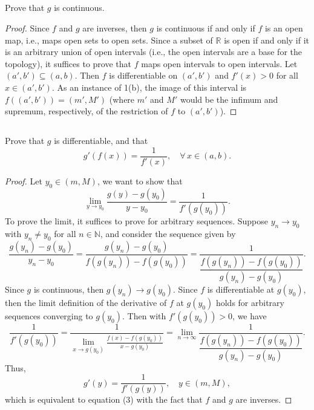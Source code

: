 \documentclass[12pt]{article}
\newenvironment{problem}
    {\begin{lrbox}{\mybox}\begin{minipage}{0.98\textwidth}}
    {\end{minipage}\end{lrbox}\begin{center}\framebox[\textwidth]{\usebox{\mybox}}\end{center}}
\theoremstyle{definition}
\newcommand{\ds}{\displaystyle}
\newcommand{\N}{\mathbb{N}}
\newcommand{\R}{\mathbb{R}}
\begin{document}
\subsection{}
\begin{problem}
    Prove that $g$ is continuous.
\end{problem}

\begin{proof}
    Since $f$ and $g$ are inverses, then $g$ is continuous if and only if $f$ is an open map, i.e., maps open sets to open sets. Since a subset of $\R$ is open if and only if it is an arbitrary union of open intervals (i.e., the open intervals are a base for the topology), it suffices to prove that $f$ maps open intervals to open intervals. Let $(a', b') \subseteq (a, b)$. Then $f$ is differentiable on $(a', b')$ and $f'(x) > 0$ for all $x \in (a', b')$. As an instance of 1(b), the image of this interval is $f((a', b')) = (m', M')$ (where $m'$ and $M'$ would be the infimum and supremum, respectively, of the restriction of $f$ to $(a', b')$).
    
\end{proof}

\newpage
\subsection{}
\begin{problem}
    Prove that $g$ is differentiable, and that 
    \begin{equation}
    g'(f(x)) = \frac{1}{f'(x)},\quad \forall\,x\in(a,b).
    \end{equation}
\end{problem}

\begin{proof}
    Let $y_0 \in (m, M)$, we want to show that
    \[
        \lim_{y \to y_0} \frac{g(y) - g(y_0)}{y - y_0} = \frac{1}{f'(g(y_0))}.
    \]
    To prove the limit, it suffices to prove for arbitrary sequences. Suppose $y_n \to y_0$ with $y_n \ne y_0$ for all $n \in \N$, and consider the sequence given by
    \[
        \frac{g(y_n) - g(y_0)}{y_n - y_0}
            = \frac{g(y_n) - g(y_0)}{f(g(y_n)) - f(g(y_0))}
            = \frac{1}{\dfrac{f(g(y_n)) - f(g(y_0))}{g(y_n) - g(y_0)}}.
    \]
    Since $g$ is continuous, then $g(y_n) \to g(y_0)$. Since $f$ is differentiable at $g(y_0)$, then the limit definition of the derivative of $f$ at $g(y_0)$ holds for arbitrary sequences converging to $g(y_0)$. Then with $f'(g(y_0)) > 0$, we have
    \[
        \frac{1}{f'(g(y_0))}
            = \frac{1}{\ds\lim_{x \to g(y_0)} \frac{f(x) - f(g(y_0))}{x - g(y_0)}}
            = \lim_{n \to \infty} \frac{1}{\dfrac{f(g(y_n)) - f(g(y_0))}{g(y_n) - g(y_0)}}.
    \]
    Thus, 
    \[
        g'(y) = \frac{1}{f'(g(y))}, \quad y \in (m, M),
    \]
    which is equivalent to equation (3) with the fact that $f$ and $g$ are inverses.
    
\end{proof}
\end{document}
